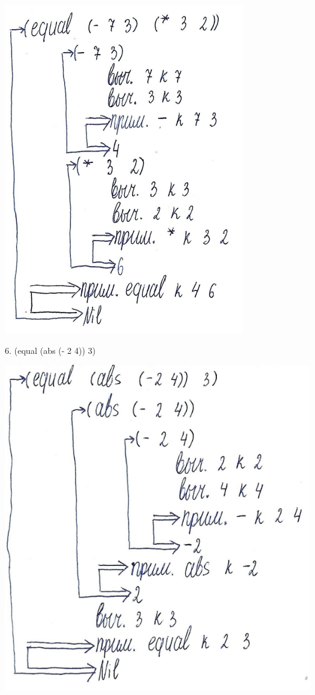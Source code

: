 \documentclass[12pt]{report}
\begin{document}
\includegraphics[scale=1]{img/1.5}

6. (equal (abs (- 2 4)) 3)

\includegraphics[scale=1]{img/1.6}
\end{document}
